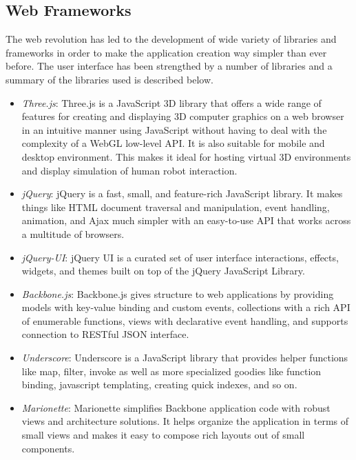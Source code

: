 \subsection{Web Frameworks}
The web revolution has led to the development of wide variety of libraries and frameworks in order to make the application creation way simpler than ever before. The user interface has been strengthed by a number of libraries and a summary of the libraries used is described below.
\begin{itemize}[leftmargin={1cm},topsep={0pt},itemsep={0pt},partopsep={0pt},parsep={0pt}] 
\item \emph{Three.js}: Three.js is a JavaScript 3D library that offers a wide range of features for creating and displaying 3D computer graphics on a web browser in an intuitive manner using JavaScript without having to deal with the complexity of a WebGL low-level API. It is also suitable for mobile and desktop environment. This makes it ideal for hosting virtual 3D environments and display simulation of human robot interaction.
\item \emph{jQuery}: jQuery is a fast, small, and feature-rich JavaScript library. It makes things like HTML document traversal and manipulation, event handling, animation, and Ajax much simpler with an easy-to-use API that works across a multitude of browsers. 
\item \emph{jQuery-UI}: jQuery UI is a curated set of user interface interactions, effects, widgets, and themes built on top of the jQuery JavaScript Library. 
\item \emph{Backbone.js}: Backbone.js gives structure to web applications by providing models with key-value binding and custom events, collections with a rich API of enumerable functions, views with declarative event handling, and supports connection to RESTful JSON interface.
\item \emph{Underscore}: Underscore is a JavaScript library that provides helper functions like map, filter, invoke as well as more specialized goodies like function binding, javascript templating, creating quick indexes, and so on.
\item \emph{Marionette}: Marionette simplifies Backbone application code with robust views and architecture solutions. It helps organize the application in terms of small views and makes it easy to compose rich layouts out of small components.
\end{itemize}
